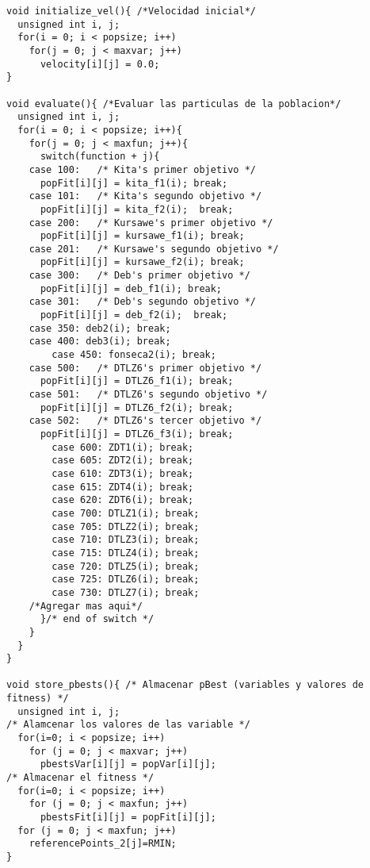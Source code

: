 \begin{lstlisting}[style=C]
void initialize_vel(){ /*Velocidad inicial*/
  unsigned int i, j;
  for(i = 0; i < popsize; i++)
    for(j = 0; j < maxvar; j++)
      velocity[i][j] = 0.0;
}

void evaluate(){ /*Evaluar las particulas de la poblacion*/
  unsigned int i, j;
  for(i = 0; i < popsize; i++){
    for(j = 0; j < maxfun; j++){
      switch(function + j){
	case 100:	/* Kita's primer objetivo */
	  popFit[i][j] = kita_f1(i); break;
	case 101:	/* Kita's segundo objetivo */
	  popFit[i][j] = kita_f2(i);  break;
	case 200:	/* Kursawe's primer objetivo */
	  popFit[i][j] = kursawe_f1(i); break;
	case 201:	/* Kursawe's segundo objetivo */
	  popFit[i][j] = kursawe_f2(i); break;
	case 300:	/* Deb's primer objetivo */
	  popFit[i][j] = deb_f1(i); break;
	case 301:	/* Deb's segundo objetivo */
	  popFit[i][j] = deb_f2(i);  break;
	case 350: deb2(i); break;
	case 400: deb3(i); break;
        case 450: fonseca2(i); break;
	case 500:	/* DTLZ6's primer objetivo */
	  popFit[i][j] = DTLZ6_f1(i); break;
	case 501:	/* DTLZ6's segundo objetivo */
	  popFit[i][j] = DTLZ6_f2(i); break;
	case 502:	/* DTLZ6's tercer objetivo */
	  popFit[i][j] = DTLZ6_f3(i); break;
        case 600: ZDT1(i); break;
        case 605: ZDT2(i); break;
        case 610: ZDT3(i); break;
        case 615: ZDT4(i); break;
        case 620: ZDT6(i); break;
        case 700: DTLZ1(i); break;
        case 705: DTLZ2(i); break;
        case 710: DTLZ3(i); break;
        case 715: DTLZ4(i); break;
        case 720: DTLZ5(i); break;
        case 725: DTLZ6(i); break;
        case 730: DTLZ7(i); break;
	/*Agregar mas aqui*/
      }/* end of switch */
    }
  }
}

void store_pbests(){ /* Almacenar pBest (variables y valores de fitness) */
  unsigned int i, j;
/* Alamcenar los valores de las variable */
  for(i=0; i < popsize; i++)
    for (j = 0; j < maxvar; j++)
      pbestsVar[i][j] = popVar[i][j];
/* Almacenar el fitness */
  for(i=0; i < popsize; i++)
    for (j = 0; j < maxfun; j++)
      pbestsFit[i][j] = popFit[i][j];
  for (j = 0; j < maxfun; j++)
    referencePoints_2[j]=RMIN;
}


\end{lstlisting}
